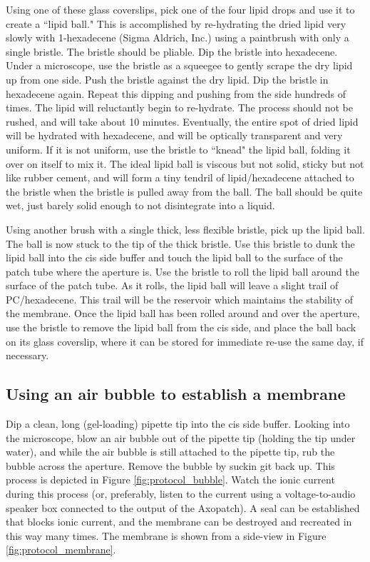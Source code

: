 Using one of these glass coverslips, pick one of the four lipid drops and use it to create a ``lipid ball."  This is accomplished by re-hydrating the dried lipid very slowly with 1-hexadecene (Sigma Aldrich, Inc.) using a paintbrush with only a single bristle.  The bristle should be pliable.  Dip the bristle into hexadecene.  Under a microscope, use the bristle as a squeegee to gently scrape the dry lipid up from one side.  Push the bristle against the dry lipid.  Dip the bristle in hexadecene again.  Repeat this dipping and pushing from the side hundreds of times.  The lipid will reluctantly begin to re-hydrate.  The process should not be rushed, and will take about \num{10} minutes.  Eventually, the entire spot of dried lipid will be hydrated with hexadecene, and will be optically transparent and very uniform.  If it is not uniform, use the bristle to ``knead" the lipid ball, folding it over on itself to mix it.  The ideal lipid ball is viscous but not solid, sticky but not like rubber cement, and will form a tiny tendril of lipid/hexadecene attached to the bristle when the bristle is pulled away from the ball.  The ball should be quite wet, just barely solid enough to not disintegrate into a liquid.

Using another brush with a single thick, less flexible bristle, pick up the lipid ball.  The ball is now stuck to the tip of the thick bristle.  Use this bristle to dunk the lipid ball into the cis side buffer and touch the lipid ball to the surface of the patch tube where the aperture is.  Use the bristle to roll the lipid ball around the surface of the patch tube.  As it rolls, the lipid ball will leave a slight trail of PC/hexadecene.  This trail will be the reservoir which maintains the stability of the membrane.  Once the lipid ball has been rolled around and over the aperture, use the bristle to remove the lipid ball from the cis side, and place the ball back on its glass coverslip, where it can be stored for immediate re-use the same day, if necessary.

\subsection{Using an air bubble to establish a membrane}

Dip a clean, long (gel-loading) pipette tip into the cis side buffer.  Looking into the microscope, blow an air bubble out of the pipette tip (holding the tip under water), and while the air bubble is still attached to the pipette tip, rub the bubble across the aperture.  Remove the bubble by suckin git back up.  This process is depicted in Figure \ref{fig:protocol_bubble}.  Watch the ionic current during this process (or, preferably, listen to the current using a voltage-to-audio speaker box connected to the output of the Axopatch).  A seal can be established that blocks ionic current, and the membrane can be destroyed and recreated in this way many times.  The membrane is shown from a side-view in Figure \ref{fig:protocol_membrane}.

